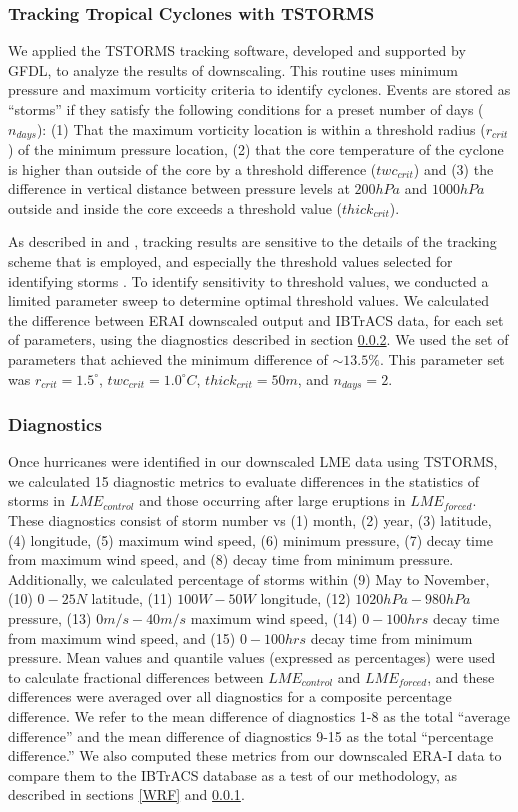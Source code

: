 \documentclass[smallextended]{svjour3}       %
\begin{document}
\subsubsection{Tracking Tropical Cyclones with TSTORMS}
\label{tstorms}
We applied the TSTORMS \cite{tc_algo} tracking software, developed and
supported by GFDL, to analyze the results of downscaling. This routine
uses minimum pressure and maximum vorticity criteria to identify
cyclones. Events are stored as ``storms'' if they satisfy the
following conditions for a preset number of days ($n_{days}$): (1)
That the maximum vorticity location is within a threshold radius
($r_{crit}$) of the minimum pressure location, (2) that the core
temperature of the cyclone is higher than outside of the core by a
threshold difference ($twc_{crit}$) and (3) the difference in vertical
distance between pressure levels at $200hPa$ and $1000hPa$ outside and
inside the core exceeds a threshold value ($thick_{crit}$).

As described in \cite{kerry_clivar} and \cite{tc_algo}, tracking
results are sensitive to the details of the tracking scheme that is
employed, and especially the threshold values selected for identifying
storms \cite{tc_track}. To identify sensitivity to threshold values,
we conducted a limited parameter sweep to determine optimal threshold
values. We calculated the difference between ERAI downscaled output
and IBTrACS data, for each set of parameters, using the diagnostics
described in section \ref{diags}. We used the set of parameters that
achieved the minimum difference of ${\sim}13.5\%$. This parameter set
was $r_{crit} = 1.5^{\circ}$, $twc_{crit} = 1.0^{\circ}C$,
$thick_{crit} = 50m$, and $n_{days} = 2$.

\subsubsection{Diagnostics}
\label{diags}
Once hurricanes were identified in our downscaled LME data using
TSTORMS, we calculated 15 diagnostic metrics to evaluate differences
in the statistics of storms in $LME_{control}$ and those occurring
after large eruptions in $LME_{forced}$.  These diagnostics consist of
storm number vs (1) month, (2) year, (3) latitude, (4) longitude, (5)
maximum wind speed, (6) minimum pressure, (7) decay time from maximum
wind speed, and (8) decay time from minimum pressure. Additionally, we
calculated percentage of storms within (9) May to November, (10)
$0-25N$ latitude, (11) $100W-50W$ longitude, (12) $1020hPa-980hPa$
pressure, (13) $0m/s-40m/s$ maximum wind speed, (14) $0-100hrs$ decay
time from maximum wind speed, and (15) $0-100hrs$ decay time from
minimum pressure. Mean values and quantile values (expressed as
percentages) were used to calculate fractional differences between
$LME_{control}$ and $LME_{forced}$, and these differences were
averaged over all diagnostics for a composite percentage
difference. We refer to the mean difference of diagnostics 1-8 as the
total ``average difference'' and the mean difference of diagnostics
9-15 as the total ``percentage difference.'' We also computed these
metrics from our downscaled ERA-I data to compare them to the IBTrACS
database as a test of our methodology, as described in sections
\ref{WRF} and \ref{tstorms}.
\end{document}
